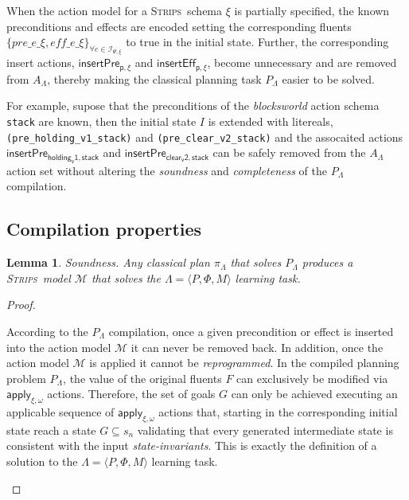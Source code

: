 \documentclass{article}
\newcommand{\tup}[1]{{\langle #1 \rangle}}
\newcommand{\strips}{\textsc{Strips}}
\newtheorem{mylemma}[mytheorem]{Lemma}
\begin{document}
When the action model for a \strips\ schema $\xi$ is partially specified, the known preconditions and effects are encoded setting the corresponding fluents $\{pre\_e\_\xi, eff\_e\_\xi\}_{\forall e\in{\mathcal I}_{\Psi,\xi}}$ to true in the initial state. Further, the corresponding insert actions, $\mathsf{insertPre_{p,\xi}}$ and $\mathsf{insertEff_{p,\xi}}$, become unnecessary and are removed from $A_{\Lambda}$, thereby making the classical planning task $P_{\Lambda}$ easier to be solved.

For example, supose that the preconditions of the {\em blocksworld} action schema {\tt stack} are known, then the initial state $I$ is extended with litereals, {\small\tt(pre\_holding\_v1\_stack)} and {\small\tt(pre\_clear\_v2\_stack)} and the assocaited actions $\mathsf{insertPre_{holding_v1,stack}}$ and $\mathsf{insertPre_{clear_v2,stack}}$ can be safely removed from the $A_{\Lambda}$ action set without altering the {\em soundness} and {\em completeness} of the $P_{\Lambda}$ compilation.

\subsection{Compilation properties}
\begin{mylemma}
Soundness. Any classical plan $\pi_{\Lambda}$ that solves $P_{\Lambda}$ produces a \strips\ model $\mathcal{M}$ that solves the $\Lambda=\tup{P,\Phi,M}$ learning task.
\end{mylemma}

\begin{proof}[Proof]
\begin{small}
According to the $P_{\Lambda}$ compilation, once a given precondition or effect is inserted into the action model $\mathcal{M}$ it can never be removed back. In addition, once the action model $\mathcal{M}$ is applied it cannot be {\em reprogrammed}. In the compiled planning problem $P_{\Lambda}$, the value of the original fluents $F$ can exclusively be modified via $\mathsf{apply_{\xi,\omega}}$ actions.  Therefore, the set of goals $G$ can only be achieved executing an applicable sequence of $\mathsf{apply_{\xi,\omega}}$ actions that, starting in the corresponding initial state reach a state $G \subseteq s_n$ validating that every generated intermediate state is consistent with the input {\em state-invariants}. This is exactly the definition of a solution to the $\Lambda=\tup{P,\Phi,M}$ learning task. 
\end{small}
\end{proof}
\end{document}

